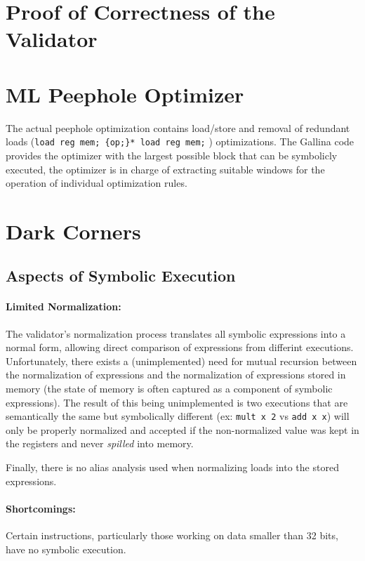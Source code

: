 \documentclass{article}
\begin{document}
\section{Proof of Correctness of the Validator}

\section{ML Peephole Optimizer}
The actual peephole optimization contains load/store and removal of
redundant loads ({\tt load reg mem; \{op;\}* load reg mem;}
) optimizations.  The Gallina
code provides the optimizer with the largest possible block that can
be symbolicly executed, the optimizer is in charge of extracting
suitable windows for the operation of individual optimization rules.

\section{Dark Corners}
\subsection{Aspects of Symbolic Execution}
\paragraph{Limited Normalization: }The validator's normalization
process translates all symbolic expressions into a normal form,
allowing direct comparison of expressions from differint executions.
Unfortunately, there exists a (unimplemented) need for mutual recursion
between the normalization of expressions and the normalization of expressions
stored in memory (the state of memory is often captured as a component of
symbolic expressions).
The result of this being unimplemented is two executions that are semantically
the same but symbolically different (ex: {\tt mult x 2} vs {\tt add x x})
will only be properly normalized and accepted if the non-normalized
value was kept in the registers and never {\it spilled} into memory.

Finally, there is no alias analysis used when normalizing loads into the
stored expressions.

\paragraph{Shortcomings: }
Certain instructions, particularly those working on data
smaller than 32 bits, have no symbolic execution.
\end{document}
